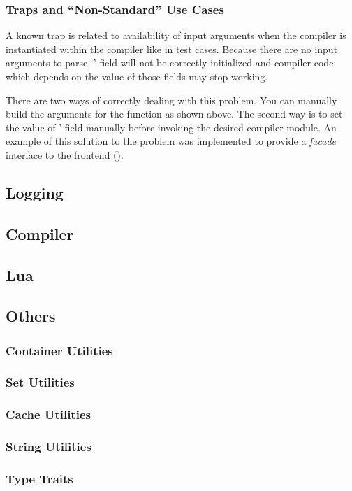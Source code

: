 \subsubsection{Traps and ``Non-Standard'' Use Cases}
A known trap is related to availability of input arguments when the compiler is
instantiated within the compiler like in test cases. Because there are no input
arguments to parse, ' field will not be correctly
initialized and compiler code which depends on the value of those fields may
stop working. 

There are two ways of correctly dealing with this problem. You can manually
build the arguments for the  function as shown above.  The
second way is to set the value of ' field manually
before invoking the desired compiler module. An example of this solution to the
problem was implemented to provide a \emph{facade} interface to the frontend
(). 



\subsection{Logging}
\subsection{Compiler}
\subsection{Lua}
\subsection{Others}
\subsubsection{Container Utilities}
\subsubsection{Set Utilities}
\subsubsection{Cache Utilities}
\subsubsection{String Utilities}
\subsubsection{Type Traits}




